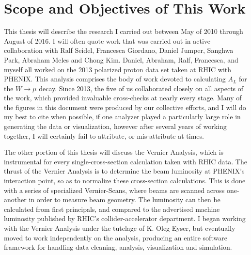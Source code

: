 \section{Scope and Objectives of This Work}
This thesis will describe the research I carried out between May of 2010 through
August of 2016. I will often quote work that was carried out in active
collaboration with Ralf Seidel, Francesca Giordano, Daniel Jumper, Sanghwa Park,
Abraham Meles and Chong Kim. Daniel, Abraham, Ralf, Francesca, and myself all
worked on the 2013 polarized proton data set taken at RHIC with PHENIX. This
analysis comprises the body of work devoted to calculating $A_L$ for the
$W\rightarrow\mu$ decay. Since 2013, the five of us collaborated closely on all
aspects of the work, which provided invaluable cross-checks at nearly every
stage. Many of the figures in this document were produced by our collective
efforts, and I will do my best to cite when possible, if one analyzer played a
particularly large role in generating the data or visualization, however after
several years of working together, I will certainly fail to attribute, or
mis-attribute at times.

The other portion of this thesis will discuss the Vernier Analysis, which is
instrumental for every single-cross-section calculation taken with RHIC data.
The thrust of the Vernier Analysis is to determine the beam luminosity at
PHENIX's interaction point, so as to normalize these cross-section calculations.
This is done with a series of specialized Vernier-Scans, where beams are scanned
across one-another in order to measure beam geometry. The luminosity can then be
calculated from first principals, and compared to the advertised machine
luminosity published by RHIC's collider-accelerator department. I began working
with the Vernier Analysis under the tutelage of K. Oleg Eyser, but eventually
moved to work independently on the analysis, producing an entire software
framework for handling data cleaning, analysis, visualization and simulation.
